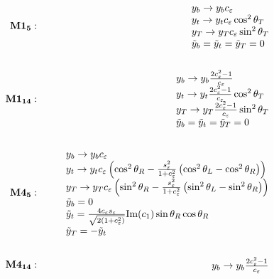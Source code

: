 \documentclass[12pt,a4wide]{article}
\begin{document}
\begin{eqnarray}
	\textbf{M1}_{\textbf{5}}: && \hspace{5mm} \begin{array}{l} 
		y_b \rightarrow y_b c_\varepsilon \\ 
		y_t \rightarrow y_t c_\varepsilon \cos^2 \theta_T \\ 
		y_T \rightarrow y_T c_\varepsilon \sin^2 \theta_T \\ 
		\tilde{y}_b = \tilde{y}_t = \tilde{y}_T = 0 
	\end{array} \\ \nonumber \\ 
	\textbf{M1}_{\textbf{14}}: && \hspace{5mm} \begin{array}{l} 
		y_b \rightarrow y_b \frac{2 c_\varepsilon^2 - 1}{c_\varepsilon} \\ 
		y_t \rightarrow y_t \frac{2 c_\varepsilon^2 - 1}{c_\varepsilon} \cos^2\theta_T  \\ 
		y_T \rightarrow y_T \frac{2 c_\varepsilon^2 - 1}{c_\varepsilon} \sin^2\theta_T  \\ 
		\tilde{y}_b = \tilde{y}_t = \tilde{y}_T = 0 
	\end{array} \\ \nonumber \\ 
	\textbf{M4}_{\textbf{5}}: && \hspace{5mm} \begin{array}{l} 
		y_b \rightarrow y_b c_\varepsilon \\ 
		y_t \rightarrow y_t c_\varepsilon \left ( \cos^2\theta_R - \frac{s_\varepsilon^2}{1 + c_\varepsilon^2} \left ( \cos^2\theta_L - \cos^2\theta_R \right ) \right ) \\ 
		y_T \rightarrow y_T c_\varepsilon \left ( \sin^2\theta_R - \frac{s_\varepsilon^2}{1 + c_\varepsilon^2} \left ( \sin^2\theta_L - \sin^2\theta_R \right ) \right ) \\ 
		\tilde{y}_b = 0 \\
		\tilde{y}_t = \frac{4 c_\varepsilon s_\varepsilon}{\sqrt{2(1 + c_\varepsilon^2)}} \text{Im}(c_1) \sin\theta_R \cos\theta_R \\ 
		\tilde{y}_T = -\tilde{y}_t 
	\end{array} \\ \nonumber \\ 
	\textbf{M4}_{\textbf{14}}: && \hspace{5mm} \begin{array}{l} 
		y_b \rightarrow y_b \frac{2 c_\varepsilon^2 - 1}{c_\varepsilon} \\ 

\end{array}
\end{eqnarray}
\end{document}
